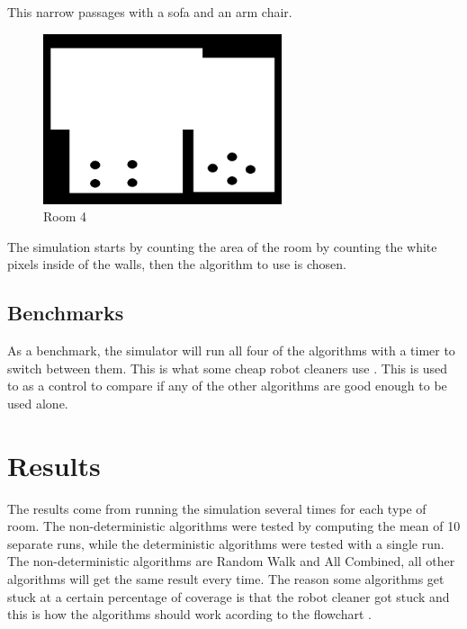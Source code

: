 \documentclass[bachelor]{kththesis}
\begin{document}
This narrow passages with a sofa and an arm chair.
\begin{figure}[H]
	\includegraphics[width=7cm]{img/room2furn.png}
	\centering
	\caption{Room 4}
\end{figure}
\bigskip 
\noindent The simulation starts by counting the area of the room by counting the white pixels inside of the walls, then the algorithm to use is chosen. 



\section{Benchmarks}
As a benchmark, the simulator will run all four of the algorithms with a timer to switch between them. This is what some cheap robot cleaners use \parencite{hasan}.
This is used to as a control to compare if any of the other algorithms are good enough to be used alone.


\chapter{Results}
The results come from running the simulation several times for each type of room. The non-deterministic algorithms were tested by computing the
mean of 10 separate runs, while the deterministic algorithms were 
tested with a single run.
The non-deterministic algorithms are Random Walk and All Combined, all other algorithms will get the same result every time.
The reason some algorithms get stuck at a certain percentage of coverage is that the robot cleaner got stuck and this is how the algorithms should work acording to the flowchart \parencite{hasan}.
\end{document}
